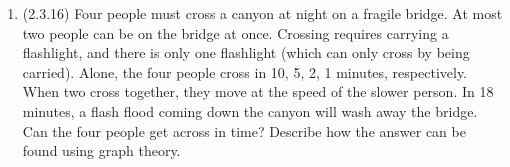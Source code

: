 \documentclass[11pt]{amsart}%
\begin{document}
\begin{enumerate}
\item (2.3.16) Four people must cross a canyon at night on a fragile bridge.  At most two people can be on the bridge at once.  Crossing requires carrying a flashlight, and there is only one flashlight (which can only cross by being carried).  Alone, the four people cross in 10, 5, 2, 1 minutes, respectively.  When two cross together, they move at the speed of the slower person.  In 18 minutes, a flash flood coming down the canyon will wash away the bridge.  Can the four people get across in time?  Describe how the answer can be found using graph theory.

\end{enumerate}
\end{document}
